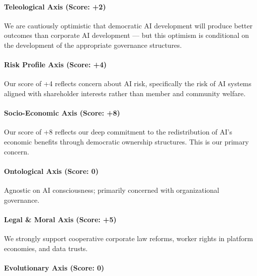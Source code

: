 \paragraph{Teleological Axis (Score:
+2)}\label{teleological-axis-score-2-4}

We are cautiously optimistic that democratic AI development will produce
better outcomes than corporate AI development --- but this optimism is
conditional on the development of the appropriate governance structures.

\paragraph{Risk Profile Axis (Score:
+4)}\label{risk-profile-axis-score-4}

Our score of +4 reflects concern about AI risk, specifically the risk of
AI systems aligned with shareholder interests rather than member and
community welfare.

\paragraph{Socio-Economic Axis (Score:
+8)}\label{socio-economic-axis-score-8-1}

Our score of +8 reflects our deep commitment to the redistribution of
AI's economic benefits through democratic ownership structures. This is
our primary concern.

\paragraph{Ontological Axis (Score:
0)}\label{ontological-axis-score-0-14}

Agnostic on AI consciousness; primarily concerned with organizational
governance.

\paragraph{Legal \& Moral Axis (Score:
+5)}\label{legal-moral-axis-score-5-4}

We strongly support cooperative corporate law reforms, worker rights in
platform economies, and data trusts.

\paragraph{Evolutionary Axis (Score:
0)}\label{evolutionary-axis-score-0-6}

